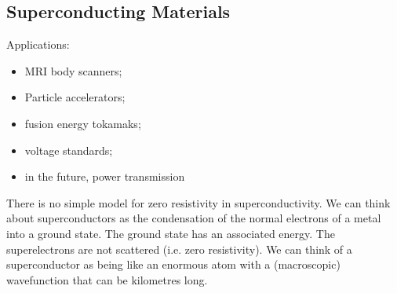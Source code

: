 \documentclass[a4paper, 11pt, normalem]{report}
\begin{document}
\section{Superconducting Materials}
Applications:
\begin{itemize}
    \item MRI body scanners;
    \item Particle accelerators;
    \item fusion energy tokamaks;
    \item voltage standards;
    \item in the future, power transmission
\end{itemize}
There is no simple model for zero resistivity in superconductivity.
We can think about superconductors as the condensation of the normal electrons of a metal into a ground state.
The ground state has an associated energy.
The superelectrons are not scattered (i.e. zero resistivity).
We can think of a superconductor as being like an enormous atom with a (macroscopic) wavefunction that can be kilometres long.

\chapter{}
\end{document}
